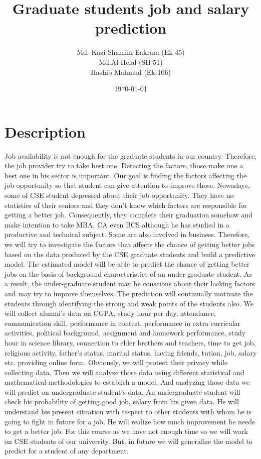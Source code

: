 \documentclass{report}
\begin{document}
\title{Graduate students job and salary prediction}
\author{Md. Kazi Shamim Eakram (Ek-45)\\Md.Al-Helal (SH-51) \\ Hashib Mahmud (Ek-106)}
\date{\today}
\maketitle
\section*{Description}
Job availability is not enough for the graduate students in our country. Therefore, the job provider try to take best one. Detecting the factors, those make one a best one in his sector is important. Our goal is finding the factors affecting the job opportunity  so that student can give attention to improve those. Nowadays, some of CSE student depressed about their job opportunity. They have no statistics of their seniors and they don't know which factors are responsible for getting a better job. Consequently, they complete their graduation somehow and make intention to take MBA, CA even BCS although he has studied in a productive and technical subject. Some are also involved in business. Therefore, we will try to investigate the factors that affects the chance of getting better jobs based on the data produced by the CSE graduate students and build a predictive model. The estimated model will be able to predict the chance of getting better jobs on the basis of background characteristics of an under-graduate student. As a result, the   under-graduate student may be conscious about their lacking factors and may try to improve themselves.  The prediction will continually motivate the students through identifying the strong and weak points of the students also. We will collect alumni's data on CGPA, study hour per day, attendance, communication skill, performance in contest, performance in extra curricular activities, political background, assignment and homework performance, study hour in science library, connection to elder brothers and teachers, time to get job, religious activity, father's status, marital status, having friends, tution, job, salary   etc. providing online form. Obviously, we will protect their privacy while collecting data. Then we will analyze those data using different statistical and mathematical methodologies to establish a model. And analyzing those data we will predict on undergraduate student's data. An undergraduate student will check his probability of getting good job, salary from  his given data. He will understand his present situation with respect to other students with whom he is going to fight in future for a job. He will realize how much improvement  he needs to get a better job.
For this course as we have not enough time so we will work on CSE students of our university. But, in future we will generalize the model to predict for a student of any department.
\end{document}
